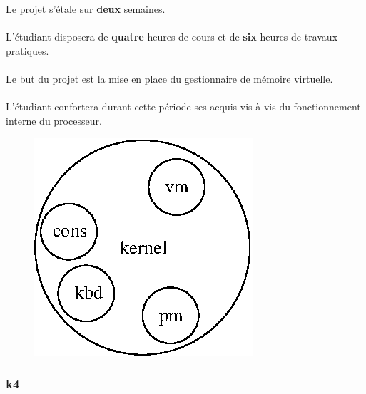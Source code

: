 \documentclass[10pt,a4wide]{article}
\begin{document}
Le projet s'\'etale sur \textbf{deux} semaines.

\paragraph{}

L'\'etudiant disposera de \textbf{quatre} heures de cours et de \textbf{six}
heures de travaux pratiques.

\paragraph{}

Le but du projet est la mise en place du gestionnaire de m\'emoire virtuelle.

\paragraph{}

L'\'etudiant confortera durant cette p\'eriode ses acquis vis-\`a-vis du
fonctionnement interne du processeur.

\vspace{5cm}

\begin{figure}[h]
\centerline{\includegraphics{figures/k3.eps}}
\end{figure}

\newpage

\subsubsection{k4}

\paragraph{}
\end{document}
